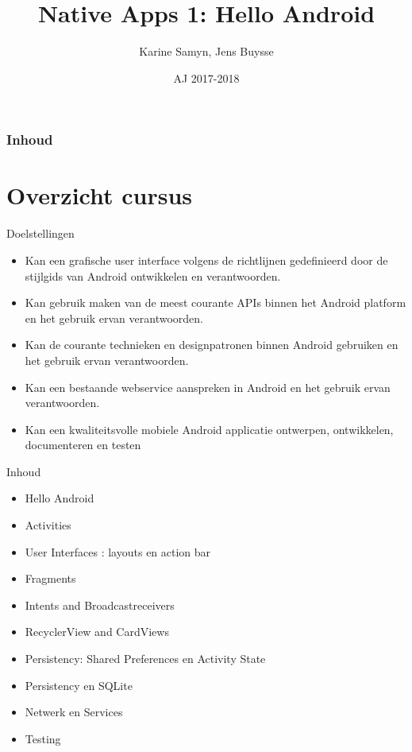 \documentclass{beamer}
\title[Intro]{Native Apps 1: Hello Android}
\author{Karine Samyn, Jens Buysse}
\date{AJ 2017-2018}
\begin{document}

\HoGentLogo

\titleframe


\begin{frame}
  \frametitle{Inhoud}

  \tableofcontents
\end{frame}


\section{Overzicht cursus}


\begin{frame}{Doelstellingen}
\begin{itemize}
	\item Kan een grafische user interface volgens de richtlijnen gedefinieerd door de stijlgids van Android ontwikkelen en verantwoorden.
\item	Kan gebruik maken van de meest courante APIs binnen het Android platform en het gebruik ervan verantwoorden. 
\item	Kan de courante technieken en designpatronen binnen Android gebruiken en het gebruik ervan verantwoorden. 
\item	Kan een bestaande webservice aanspreken in Android en het gebruik ervan verantwoorden. 
\item	Kan een kwaliteitsvolle mobiele Android applicatie ontwerpen, ontwikkelen, documenteren en testen 
\end{itemize}
	
\end{frame}

\begin{frame}{Inhoud}
\begin{itemize}
	\item Hello Android
	\item	Activities
	\item	User Interfaces : layouts en action bar
	\item Fragments 
	\item	Intents and Broadcastreceivers
	\item RecyclerView and CardViews
	\item  Persistency: Shared Preferences en Activity State
	\item  Persistency en SQLite
	\item Netwerk en Services
	\item Testing
\end{itemize}

\end{frame}
\end{document}
